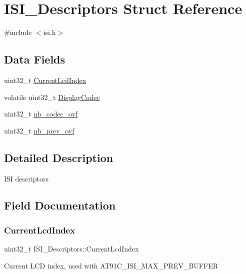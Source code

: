 \hypertarget{structISI__Descriptors}{}\section{I\+S\+I\+\_\+\+Descriptors Struct Reference}
\label{structISI__Descriptors}


{\ttfamily \#include $<$isi.\+h$>$}

\subsection*{Data Fields}
\begin{DoxyCompactItemize}
\item 
uint32\+\_\+t \mbox{\hyperlink{structISI__Descriptors_a0d497ac3e320cb053ffa01edc89f18ad}{Current\+Lcd\+Index}}
\item 
volatile uint32\+\_\+t \mbox{\hyperlink{structISI__Descriptors_aedeef15d83dc9777e8bcc764f78755e6}{Display\+Codec}}
\item 
uint32\+\_\+t \mbox{\hyperlink{structISI__Descriptors_a811f73460a418af9a5a1e44524bf9676}{nb\+\_\+codec\+\_\+ovf}}
\item 
uint32\+\_\+t \mbox{\hyperlink{structISI__Descriptors_a9c3303b2f3ea7e27763c432aa16a9c5a}{nb\+\_\+prev\+\_\+ovf}}
\end{DoxyCompactItemize}


\subsection{Detailed Description}
I\+SI descriptors 

\subsection{Field Documentation}
\mbox{\label{structISI__Descriptors_a0d497ac3e320cb053ffa01edc89f18ad}} 
\subsubsection{\texorpdfstring{CurrentLcdIndex}{CurrentLcdIndex}}
{\footnotesize\ttfamily uint32\+\_\+t I\+S\+I\+\_\+\+Descriptors\+::\+Current\+Lcd\+Index}

Current L\+CD index, used with A\+T91\+C\+\_\+\+I\+S\+I\+\_\+\+M\+A\+X\+\_\+\+P\+R\+E\+V\+\_\+\+B\+U\+F\+F\+ER \mbox{\label{structISI__Descriptors_aedeef15d83dc9777e8bcc764f78755e6}} 
